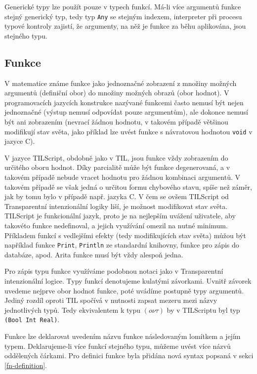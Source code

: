 Generické typy lze použít pouze v typech funkcí. Má-li více argumentů funkce stejný generický
typ, tedy typ \lstinline{Any} se stejným indexem, interpreter při procesu typové kontroly zajistí,
že argumenty, na něž je funkce za běhu aplikována, jsou stejného typu.

\subsection{Funkce}

V matematice známe funkce jako jednoznačné zobrazení z množiny možných argumentů (definiční obor)
do množiny možných obrazů (obor hodnot). V programovacích jazycích konstrukce nazývané funkcemi
často nemusí být nejen jednoznačné (výstup nemusí odpovídat pouze argumentům), ale dokonce nemusí
být ani zobrazením (nevrací žádnou hodnotu, v takovém případě většinou modifikují stav světa,
jako příklad lze uvést funkce s návratovou hodnotou \lstinline{void} v jazyce C).

V jazyce TILScript, obdobně jako v TIL, jsou funkce vždy zobrazením do určitého oboru hodnot. Díky
parcialitě může být funkce degenerovaná, a v takovém případě nebude vracet hodnotu pro žádnou
kombinaci argumentů. V takovém případě se však jedná o určitou formu chybového stavu, spíše než
záměr, jak by tomu bylo v případě např. jazyka C. V čem se ovšem TILScript od Transparentní
intenzionální logiky liší, je možnost modifikovat stav světa. TILScript je funkcionální jazyk,
proto je na nejlepším uvážení uživatele, aby takovéto funkce nedefinoval, a jejich využívání omezil
na nutné minimum. Příkladem funkcí s vedlejšími efekty (tedy modifikujících stav světa) můžou
být například funkce \lstinline{Print}, \lstinline{Println} ze standardní knihovny, funkce
pro zápis do databáze, apod. Arita funkce musí být vždy alespoň jedna.

Pro zápis typu funkce využíváme podobnou notaci jako v Transparentní intenzionální logice.
Typy funkcí denotujeme kulatými závorkami. Uvnitř závorek uvedeme nejprve obor hodnot funkce,
poté uvádíme postupně typy argumentů. Jediný rozdíl oproti TIL spočívá v nutnosti zapsat mezeru
mezi názvy jednotlivých typů. Tedy ekvivalentem k typu $(o\nu\tau)$ by v TILScriptu byl typ
\lstinline{(Bool Int Real)}.

Funkce lze deklarovat uvedením názvu funkce následovaným lomítkem a jejím typem. Deklarujeme-li
více funkcí stejného typu, můžeme uvést více názvů oddělených čárkami. Pro definici funkce byla
přidána nová syntax popsaná v sekci \ref{fn-definition}.

